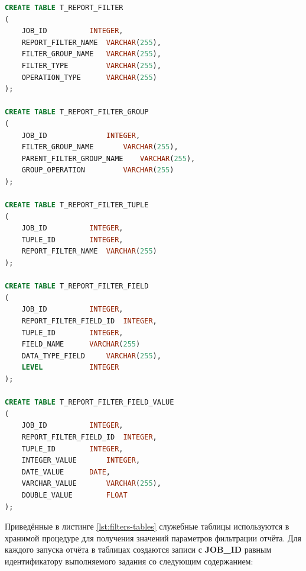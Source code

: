 \documentclass[../user-manual.tex]{subfiles}
\begin{document}
\begin{lstlisting}[language=SQL, caption={Служебные таблицы для выгрузки параметров фильтрации}, label={lst:filters-tables}]
CREATE TABLE T_REPORT_FILTER
(
	JOB_ID			INTEGER,
	REPORT_FILTER_NAME 	VARCHAR(255),
	FILTER_GROUP_NAME	VARCHAR(255),
	FILTER_TYPE 		VARCHAR(255),
	OPERATION_TYPE 		VARCHAR(255)
);

CREATE TABLE T_REPORT_FILTER_GROUP
(
	JOB_ID 				INTEGER,
	FILTER_GROUP_NAME 		VARCHAR(255),
	PARENT_FILTER_GROUP_NAME	VARCHAR(255),
	GROUP_OPERATION			VARCHAR(255)
);

CREATE TABLE T_REPORT_FILTER_TUPLE
(
	JOB_ID			INTEGER,
	TUPLE_ID		INTEGER,
	REPORT_FILTER_NAME	VARCHAR(255)
);

CREATE TABLE T_REPORT_FILTER_FIELD
(
	JOB_ID 			INTEGER,
	REPORT_FILTER_FIELD_ID	INTEGER,
	TUPLE_ID 		INTEGER,
	FIELD_NAME 		VARCHAR(255)
	DATA_TYPE_FIELD		VARCHAR(255),
	LEVEL 			INTEGER
);

CREATE TABLE T_REPORT_FILTER_FIELD_VALUE
(
	JOB_ID 			INTEGER,
	REPORT_FILTER_FIELD_ID	INTEGER,
	TUPLE_ID 		INTEGER,
	INTEGER_VALUE 		INTEGER,
	DATE_VALUE 		DATE,
	VARCHAR_VALUE 		VARCHAR(255),
	DOUBLE_VALUE 		FLOAT
);
\end{lstlisting}
	
	Приведённые в листинге \ref{lst:filters-tables} служебные таблицы используются в хранимой процедуре для получения значений параметров фильтрации отчёта. Для каждого запуска отчёта в таблицах создаются записи с \textbf{JOB\_ID} равным идентификатору выполняемого задания со следующим содержанием:
	
\end{document}
